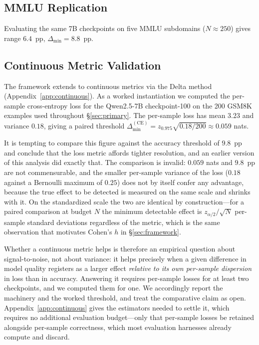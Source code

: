 \documentclass[pdflatex,sn-mathphys-ay,iicol]{sn-jnl}
\theoremstyle{thmstylethree}
\begin{document}
\begin{table}[t]
\subsection{MMLU Replication}\label{sec:mmlu}

Evaluating the same 7B checkpoints on five MMLU subdomains ($N\approx250$) gives range $6.4$~pp, $\Delta_{\min}=8.8$~pp.

\subsection{Continuous Metric Validation}\label{sec:continuous_val}

The framework extends to continuous metrics via the Delta method (Appendix~\ref{app:continuous}). As a worked instantiation we computed the per-sample cross-entropy loss for the Qwen2.5-7B checkpoint-100 on the 200 GSM8K examples used throughout \S\ref{sec:primary}. The per-sample loss has mean $3.23$ and variance $0.18$, giving a paired threshold $\Delta_{\min}^{(\text{CE})} = z_{0.975}\sqrt{0.18/200} \approx 0.059$ nats.

It is tempting to compare this figure against the accuracy threshold of $9.8$~pp and conclude that the loss metric affords tighter resolution, and an earlier version of this analysis did exactly that. The comparison is invalid: $0.059$ nats and $9.8$~pp are not commensurable, and the smaller per-sample variance of the loss ($0.18$ against a Bernoulli maximum of $0.25$) does not by itself confer any advantage, because the true effect to be detected is measured on the same scale and shrinks with it. On the standardized scale the two are identical by construction---for a paired comparison at budget $N$ the minimum detectable effect is $z_{\alpha/2}/\sqrt{N}$ per-sample standard deviations regardless of the metric, which is the same observation that motivates Cohen's $h$ in \S\ref{sec:framework}.

Whether a continuous metric helps is therefore an empirical question about signal-to-noise, not about variance: it helps precisely when a given difference in model quality registers as a larger effect \emph{relative to its own per-sample dispersion} in loss than in accuracy. Answering it requires per-sample losses for at least two checkpoints, and we computed them for one. We accordingly report the machinery and the worked threshold, and treat the comparative claim as open. Appendix~\ref{app:continuous} gives the estimators needed to settle it, which requires no additional evaluation budget---only that per-sample losses be retained alongside per-sample correctness, which most evaluation harnesses already compute and discard.


\end{table}
\end{document}
